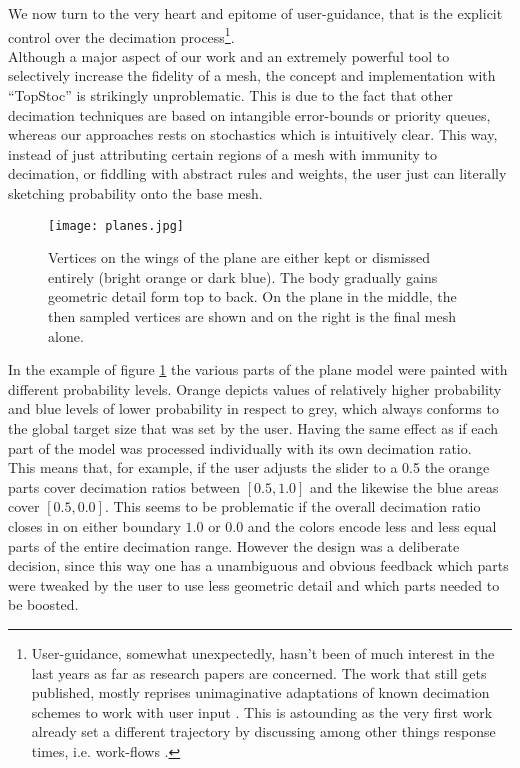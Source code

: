 We now turn to the very heart and epitome of user-guidance, that is the explicit control over the decimation process\footnote{ User-guidance, somewhat unexpectedly, hasn't been of much interest in the last years as far as research papers are concerned. The work that still gets published, mostly reprises unimaginative adaptations of known decimation schemes to work with user input \citep[cf.][]{Ho2006}. This is astounding as the very first work already set a different trajectory by discussing among other things response times, i.e. work-flows \citep[cf.][]{Cignoni1998a}.}.\\
Although a major aspect of our work and an extremely powerful tool to selectively increase the fidelity of a mesh, the concept and implementation with ``TopStoc'' is strikingly unproblematic.
This is due to the fact that other decimation techniques are based on intangible error-bounds or priority queues, whereas our approaches rests on stochastics which is intuitively clear.
This way, instead of just attributing certain regions of a mesh with immunity to decimation, or fiddling with abstract rules and weights, the user just can literally sketching probability onto the base mesh.
\begin{figure}[ht]
\centering
\texttt{[image: planes.jpg]}
\caption{Vertices on the wings of the plane are either kept or dismissed entirely (bright orange or dark blue). The body gradually gains geometric detail form top to back. On the plane in the middle, the then sampled vertices are shown and on the right is the final mesh alone.}
\label{fig:planes}
\end{figure}
In the example of figure \ref{fig:planes} the various parts of the plane model were painted with different probability levels.
Orange depicts values of relatively higher probability and blue levels of lower probability in respect to grey, which always conforms to the global target size that was set by the user.
Having the same effect as if each part of the model was processed individually with its own decimation ratio.\\  
This means that, for example, if the user adjusts the slider to a 0.5 the orange parts cover decimation ratios between $[0.5,1.0]$ and the likewise the blue areas cover $[0.5,0.0]$.
This seems to be problematic if the overall decimation ratio closes in on either boundary $1.0$ or $0.0$ and the colors encode less and less equal parts of the entire decimation range.
However the design was a deliberate decision, since this way one has a unambiguous and obvious feedback which parts were tweaked by the user to use less geometric detail and which parts needed to be boosted.
